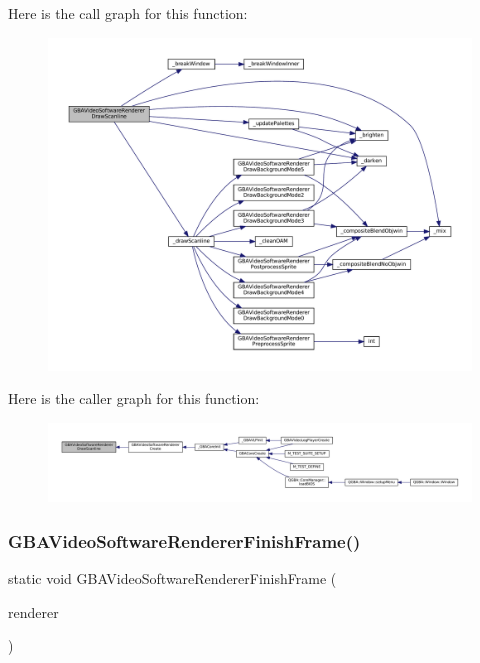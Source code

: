 Here is the call graph for this function\+:
\nopagebreak
\begin{figure}[H]
\begin{center}
\leavevmode
\includegraphics[width=350pt]{video-software_8c_a114a0223dfad6a2dcb0ad90c763ca781_cgraph}
\end{center}
\end{figure}
Here is the caller graph for this function\+:
\nopagebreak
\begin{figure}[H]
\begin{center}
\leavevmode
\includegraphics[width=350pt]{video-software_8c_a114a0223dfad6a2dcb0ad90c763ca781_icgraph}
\end{center}
\end{figure}
\mbox{\label{video-software_8c_ab3f71de0216af2e138ddf948622ffc2f}} 
\subsubsection{\texorpdfstring{G\+B\+A\+Video\+Software\+Renderer\+Finish\+Frame()}{GBAVideoSoftwareRendererFinishFrame()}}
{\footnotesize\ttfamily static void G\+B\+A\+Video\+Software\+Renderer\+Finish\+Frame (\begin{DoxyParamCaption}\item[{struct G\+B\+A\+Video\+Renderer $\ast$}]{renderer }\end{DoxyParamCaption})\hspace{0.3cm}{\ttfamily [static]}}

